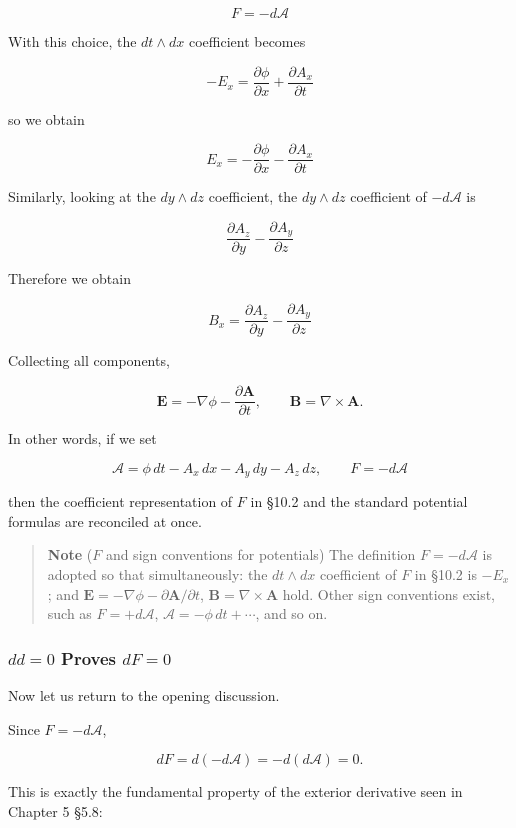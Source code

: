 \documentclass[a4paper,12pt,openany]{book}
\begin{document}
\[
F=-d\mathcal{A}
\]

With this choice, the \(dt\wedge dx\) coefficient becomes

\[
-E_x
=
\frac{\partial\phi}{\partial x}
+
\frac{\partial A_x}{\partial t}
\]

so we obtain

\[
E_x
=
-\frac{\partial\phi}{\partial x}
-
\frac{\partial A_x}{\partial t}
\]

Similarly, looking at the \(dy\wedge dz\) coefficient, the
\(dy\wedge dz\) coefficient of \(-d\mathcal{A}\) is

\[
\frac{\partial A_z}{\partial y}
-
\frac{\partial A_y}{\partial z}
\]

Therefore we obtain

\[
B_x
=
\frac{\partial A_z}{\partial y}
-
\frac{\partial A_y}{\partial z}
\]

Collecting all components,

\[
\mathbf{E}
=
-\nabla\phi
-
\frac{\partial\mathbf{A}}{\partial t},
\qquad
\mathbf{B}
=
\nabla\times\mathbf{A}.
\]

In other words, if we set

\[
\mathcal{A}
=
\phi\,dt
-
A_x\,dx
-
A_y\,dy
-
A_z\,dz,
\qquad
F=-d\mathcal{A}
\]

then the coefficient representation of \(F\) in §10.2 and the standard
potential formulas are reconciled at once.

\begin{quote}
\textbf{Note} (\(F\) and sign conventions for potentials) The definition
\(F=-d\mathcal{A}\) is adopted so that simultaneously: the
\(dt\wedge dx\) coefficient of \(F\) in §10.2 is \(-E_x\); and
\(\mathbf{E}=-\nabla\phi-\partial\mathbf{A}/\partial t\),
\(\mathbf{B}=\nabla\times\mathbf{A}\) hold. Other sign conventions
exist, such as \(F=+d\mathcal{A}\), \(\mathcal{A}=-\phi\,dt+\cdots\),
and so on.
\end{quote}

\hypertarget{dd0-proves-df0}{%
\subsubsection{\texorpdfstring{\(dd=0\) Proves
\(dF=0\)}{dd=0 Proves dF=0}}\label{dd0-proves-df0}}

Now let us return to the opening discussion.

Since \(F=-d\mathcal{A}\),

\[
dF
=
d(-d\mathcal{A})
=
-d(d\mathcal{A})
=
0.
\]

This is exactly the fundamental property of the exterior derivative seen
in Chapter 5 §5.8:
\end{document}
